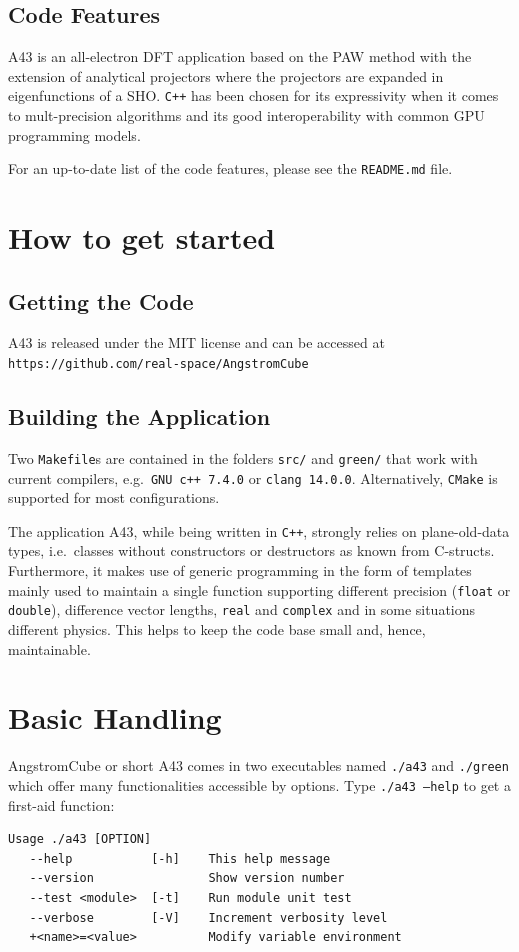 \documentclass[oribibl]{llncs}
\newcommand{\ttt}[1]{\texttt{#1}}
\newcommand{\fullcodename}{AngstromCube}
\newcommand{\codename}{A43}
\begin{document}
\subsection{Code Features} \label{sec:features}
%
\codename{} is an all-electron \ac{DFT} application 
based on the \ac{PAW} method \cite{PhysRevB.50.17953} %
with the extension of analytical projectors \cite{BaumeisterTsukamoto2019}
where the projectors are expanded in eigenfunctions of a \ac{SHO}.
\ttt{C++} has been chosen for its expressivity
when it comes to mult-precision algorithms
and its good interoperability with common \ac{GPU} programming models.

\noindent
For an up-to-date list of the code features, please see the \ttt{README.md} file.

\section{How to get started} \label{sec:how-to-get-started}
%
\subsection{Getting the Code} \label{sec:getting-the-code}
\codename{} is released under the MIT license and can be accessed at \\
\ttt{https://github.com/real-space/AngstromCube} 

\subsection{Building the Application} \label{sec:compiling}
%
Two \ttt{Makefile}s are contained in the folders \ttt{src/} and \ttt{green/} that work with current compilers, e.g.~\ttt{GNU c++ 7.4.0} or \ttt{clang 14.0.0}.
Alternatively, \ttt{CMake} is supported for most configurations.

\noindent
The application \codename{}, while being written in \ttt{C++}, strongly relies on plane-old-data types,
i.e.~classes without constructors or destructors as known from C-structs.
Furthermore, it makes use of generic programming in the form of templates
mainly used to maintain a single function supporting different precision (\ttt{float} or \ttt{double}), 
difference vector lengths, \ttt{real} and \ttt{complex} and in some situations different physics.
This helps to keep the code base small and, hence, maintainable.

\section{Basic Handling} \label{sec:basic-handling}
%
\fullcodename{} or short \codename{} comes in two executables named \ttt{./a43} and \ttt{./green} which
offer many functionalities accessible by options. Type \ttt{./a43 --help}
to get a first-aid function:
\begin{verbatim}
Usage ./a43 [OPTION]
   --help           [-h]	This help message
   --version            	Show version number
   --test <module>  [-t]	Run module unit test
   --verbose        [-V]	Increment verbosity level
   +<name>=<value>      	Modify variable environment
\end{verbatim}
\end{document}
